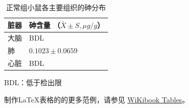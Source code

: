 \begin{table}[!htbp]
    \begin{center}
	\begin{minipage}{0.6\textwidth}
    \caption[正常组小鼠各主要组织的砷分布]{\enspace 正常组小鼠各主要组织的砷分布}
    \label{tab:mice-As}
    \normalsize%
    \setlength{\tabcolsep}{4pt}%
    \begin{tabular}{m{100pt}<{\raggedright}m{110pt}<{\raggedright}}
    \toprule
    脏器 & 砷含量 （$\bar{X} \pm S, \mu g/g$）\\
    \midrule
    大脑 &  BDL\\
    肺 &  $0.1023 \pm 0.0659$\\
    心脏 &  BDL\\
    \bottomrule
    \end{tabular}
    {\newline BDL：低于检出限}
\end{minipage}
\end{center}
\end{table}

制作\LaTeX{}表格的的更多范例，请参见 \href{https://wikibooks.cn/wiki/LaTeX/Tables}{WiKibook Tables}。